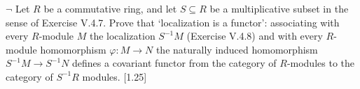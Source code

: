 \begin{problem}[1.4]
$\neg$ Let $R$ be a commutative ring, and let $S \subseteq R$ be a multiplicative subset in the sense of Exercise V.4.7. Prove that `localization is a functor': associating with every $R$-module $M$ the localization $S^{-1} M$ (Exercise V.4.8) and with every $R$-module homomorphism $\varphi: M \rightarrow N$ the naturally induced homomorphism $S^{-1} M \rightarrow S^{-1} N$ defines a covariant functor from the category of $R$-modules to the category of $S^{-1} R$ modules. [1.25]
\end{problem}
\begin{solution}
\end{solution}